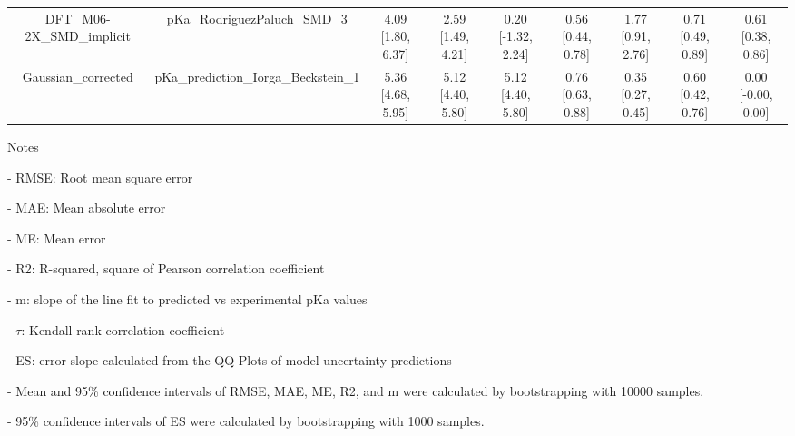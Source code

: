 \documentclass{article}
\begin{document}
\begin{center}
\begin{longtable}{|ccccccccc|}
       DFT_M06-2X_SMD_implicit &          pKa\_RodriguezPaluch\_SMD\_3 &  4.09 [1.80, 6.37] &  2.59 [1.49, 4.21] &   0.20 [-1.32, 2.24] &  0.56 [0.44, 0.78] &     1.77 [0.91, 2.76] &     0.71 [0.49, 0.89] &     0.61 [0.38, 0.86] \\
            Gaussian_corrected &  pKa\_prediction\_Iorga\_Beckstein\_1 &  5.36 [4.68, 5.95] &  5.12 [4.40, 5.80] &    5.12 [4.40, 5.80] &  0.76 [0.63, 0.88] &     0.35 [0.27, 0.45] &     0.60 [0.42, 0.76] &    0.00 [-0.00, 0.00] \\
\end{longtable}
\end{center}

Notes

- RMSE: Root mean square error

- MAE: Mean absolute error

- ME: Mean error

- R2: R-squared, square of Pearson correlation coefficient

- m: slope of the line fit to predicted vs experimental pKa values

- $\tau$:  Kendall rank correlation coefficient

- ES: error slope calculated from the QQ Plots of model uncertainty predictions

- Mean and 95\% confidence intervals of RMSE, MAE, ME, R2, and m were calculated by bootstrapping with 10000 samples.

- 95\% confidence intervals of ES were calculated by bootstrapping with 1000 samples.\end{document}
\end{document}
